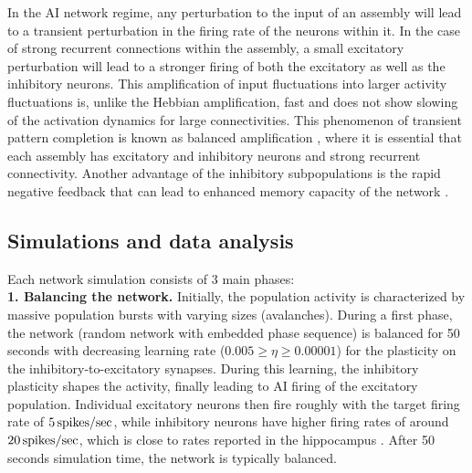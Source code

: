     In the AI network regime, any perturbation to the input of an assembly will
    lead to a transient perturbation in the firing rate of the neurons within
    it. In the case of strong recurrent connections within the assembly, a small
    excitatory perturbation will lead to a stronger firing of both the
    excitatory as well as the inhibitory neurons. This amplification of input
    fluctuations into larger activity fluctuations is, unlike the Hebbian
    amplification, fast and does not show slowing of the activation dynamics
    for large connectivities. This phenomenon of transient pattern completion
    is known as balanced amplification \citep{Murphy2009}, where it is essential
    that each assembly has excitatory and inhibitory neurons and strong
    recurrent connectivity. Another advantage of the inhibitory subpopulations
    is the rapid negative feedback that can lead to enhanced memory capacity of
    the network \citep{Kammerer2013}.

  \subsection{Simulations and data analysis}
  \label{sec:asss_sim}
    Each network simulation consists of 3 main phases:\\
    \textbf{1. Balancing the network.} Initially, the population activity is
      characterized by massive population bursts with varying sizes
      (avalanches). During a first phase, the network (random network with
      embedded phase sequence) is balanced for 50 seconds with decreasing
      learning rate ($0.005 \geq \eta \geq 0.00001$) for the plasticity on the
      inhibitory-to-excitatory synapses. During this learning, the inhibitory
      plasticity shapes the activity, finally leading to AI firing of the
      excitatory population. Individual excitatory neurons then fire roughly
      with the target firing rate of $5 \, \rm spikes/sec$, while inhibitory neurons
      have higher firing rates of around $20 \, \rm spikes/sec$, which is close to
      rates reported in the hippocampus \citep{Csicsvari2000, Cheng2013}.
      After 50 seconds simulation time, the network is typically balanced.

